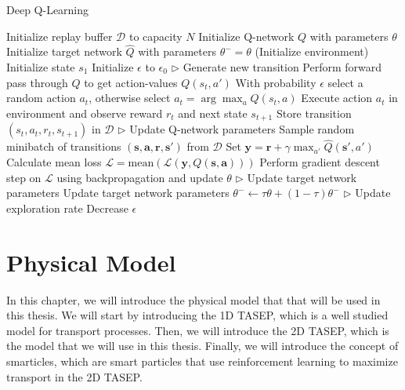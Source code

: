 \begin{algorithm}[h]
    \caption{Deep Q-Learning}
    \label{alg:dqn}
    \begin{algorithmic}
        \State Initialize replay buffer $\mathcal{D}$ to capacity $N$
        \State Initialize Q-network $Q$ with parameters $\theta$
        \State Initialize target network $\hat{Q}$ with parameters $\theta^-=\theta$
        \State (Initialize environment) 
        \State Initialize state $s_1$
        \State Initialize $\epsilon$ to $\epsilon_0$
            \State $\triangleright$ Generate new transition
            \State Perform forward pass through $Q$ to get action-values $Q(s_t, a')$ 
            \State With probability $\epsilon$ select a random action $a_t$, otherwise select $a_t = \arg\!\max_a Q(s_t, a)$
            \State Execute action $a_t$ in environment and observe reward $r_t$ and next state $s_{t+1}$
            \State Store transition $(s_t, a_t, r_t, s_{t+1})$ in $\mathcal{D}$
            \State $\triangleright$ Update Q-network parameters
            \State Sample random minibatch of transitions $(\bm{s}, \bm{a}, \bm{r}, \bm{s'})$ from $\mathcal{D}$
            \State Set $\bm{y} = \bm{r} + \gamma \max_{a'} \hat{Q}(\bm{s'}, a')$
            \State Calculate mean loss $\mathcal{L} = \text{mean}(\mathcal{L}(\bm{y}, Q(\bm{s}, \bm{a})))$
            \State Perform gradient descent step on $\mathcal{L}$ using backpropagation and update $\theta$
            \State $\triangleright$ Update target network parameters
            \State Update target network parameters $\theta^- \gets \tau \theta + (1 - \tau) \theta^-$
            \State $\triangleright$ Update exploration rate
            \State Decrease $\epsilon$   
        \EndFor
    \end{algorithmic}
\end{algorithm}

\chapter{Physical Model}
In this chapter, we will introduce the physical model that that will be used in this thesis. We will start by introducing the 1D TASEP, which is a well studied model for transport processes. Then, we will introduce the 2D TASEP, which is the model that we will use in this thesis. Finally, we will introduce the concept of smarticles, which are smart particles that use reinforcement learning to maximize transport in the 2D TASEP.

